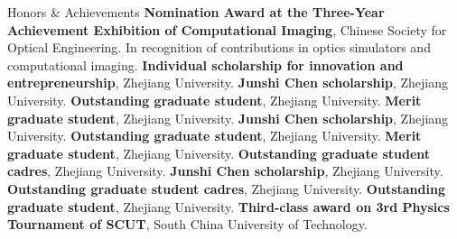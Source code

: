\begin{rubric}{Honors \& Achievements}
\entry*[2024] \textbf{Nomination Award at the Three-Year Achievement Exhibition of Computational Imaging}, Chinese Society for Optical Engineering. In recognition of contributions in optics simulators and computational imaging.
\entry*[2022] \textbf{Individual scholarship for innovation and entrepreneurship}, Zhejiang University.
\entry*[2022] \textbf{Junshi Chen scholarship}, Zhejiang University.
\entry*[2022] \textbf{Outstanding graduate student}, Zhejiang University.
\entry*[2022] \textbf{Merit graduate student}, Zhejiang University.
\entry*[2021] \textbf{Junshi Chen scholarship}, Zhejiang University.
\entry*[2021] \textbf{Outstanding graduate student}, Zhejiang University.
\entry*[2021] \textbf{Merit graduate student}, Zhejiang University.
\entry*[2021] \textbf{Outstanding graduate student cadres}, Zhejiang University.
\entry*[2020] \textbf{Junshi Chen scholarship}, Zhejiang University.
\entry*[2020] \textbf{Outstanding graduate student cadres}, Zhejiang University.
\entry*[2019] \textbf{Outstanding graduate student}, Zhejiang University.
\entry*[2015] \textbf{Third-class award on 3rd Physics Tournament of SCUT}, South China University of Technology.
\end{rubric}
